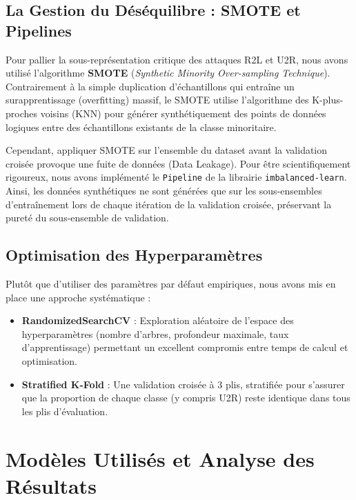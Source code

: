 \documentclass[12pt,a4paper]{report}
\begin{document}
\section{La Gestion du Déséquilibre : SMOTE et Pipelines}
Pour pallier la sous-représentation critique des attaques R2L et U2R, nous avons utilisé l'algorithme \textbf{SMOTE} (\textit{Synthetic Minority Over-sampling Technique}). Contrairement à la simple duplication d'échantillons qui entraîne un surapprentissage (overfitting) massif, le SMOTE utilise l'algorithme des K-plus-proches voisins (KNN) pour générer synthétiquement des points de données logiques entre des échantillons existants de la classe minoritaire.

Cependant, appliquer SMOTE sur l'ensemble du dataset avant la validation croisée provoque une fuite de données (Data Leakage). Pour être scientifiquement rigoureux, nous avons implémenté le \texttt{Pipeline} de la librairie \texttt{imbalanced-learn}. Ainsi, les données synthétiques ne sont générées que sur les sous-ensembles d'entraînement lors de chaque itération de la validation croisée, préservant la pureté du sous-ensemble de validation.

\section{Optimisation des Hyperparamètres}
Plutôt que d'utiliser des paramètres par défaut empiriques, nous avons mis en place une approche systématique :
\begin{itemize}
    \item \textbf{RandomizedSearchCV} : Exploration aléatoire de l'espace des hyperparamètres (nombre d'arbres, profondeur maximale, taux d'apprentissage) permettant un excellent compromis entre temps de calcul et optimisation.
    \item \textbf{Stratified K-Fold} : Une validation croisée à 3 plis, stratifiée pour s'assurer que la proportion de chaque classe (y compris U2R) reste identique dans tous les plis d'évaluation.
\end{itemize}

\chapter{Modèles Utilisés et Analyse des Résultats}
\end{document}

